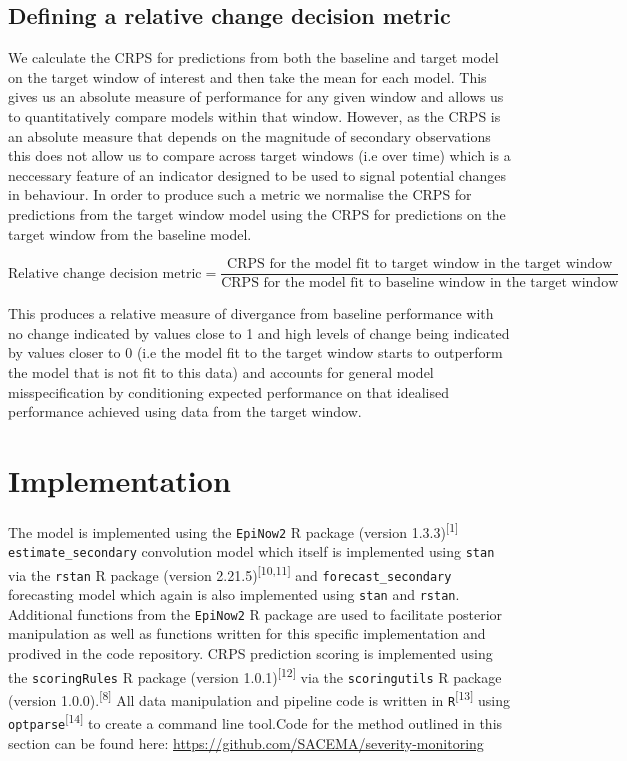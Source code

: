 \documentclass[
]{article}
\begin{document}
\hypertarget{defining-a-relative-change-decision-metric}{%
\subsection{Defining a relative change decision
metric}\label{defining-a-relative-change-decision-metric}}

We calculate the CRPS for predictions from both the baseline and target
model on the target window of interest and then take the mean for each
model. This gives us an absolute measure of performance for any given
window and allows us to quantitatively compare models within that
window. However, as the CRPS is an absolute measure that depends on the
magnitude of secondary observations this does not allow us to compare
across target windows (i.e over time) which is a neccessary feature of
an indicator designed to be used to signal potential changes in
behaviour. In order to produce such a metric we normalise the CRPS for
predictions from the target window model using the CRPS for predictions
on the target window from the baseline model.

\[ \text{Relative change decision metric} = \frac{\text{CRPS for the model fit to target window in the target window}}{\text{CRPS for the model fit to baseline window in the target window}} \]

This produces a relative measure of divergance from baseline performance
with no change indicated by values close to 1 and high levels of change
being indicated by values closer to 0 (i.e the model fit to the target
window starts to outperform the model that is not fit to this data) and
accounts for general model misspecification by conditioning expected
performance on that idealised performance achieved using data from the
target window.

\hypertarget{implementation}{%
\section{Implementation}\label{implementation}}

The model is implemented using the \texttt{EpiNow2} R package (version
1.3.3)\textsuperscript{{[}1{]}} \texttt{estimate\_secondary} convolution
model which itself is implemented using \texttt{stan} via the
\texttt{rstan} R package (version 2.21.5)\textsuperscript{{[}10,11{]}}
and \texttt{forecast\_secondary} forecasting model which again is also
implemented using \texttt{stan} and \texttt{rstan}. Additional functions
from the \texttt{EpiNow2} R package are used to facilitate posterior
manipulation as well as functions written for this specific
implementation and prodived in the code repository. CRPS prediction
scoring is implemented using the \texttt{scoringRules} R package
(version 1.0.1)\textsuperscript{{[}12{]}} via the \texttt{scoringutils}
R package (version 1.0.0).\textsuperscript{{[}8{]}} All data
manipulation and pipeline code is written in
\texttt{R}\textsuperscript{{[}13{]}} using
\texttt{optparse}\textsuperscript{{[}14{]}} to create a command line
tool.Code for the method outlined in this section can be found here:
\url{https://github.com/SACEMA/severity-monitoring}
\end{document}
